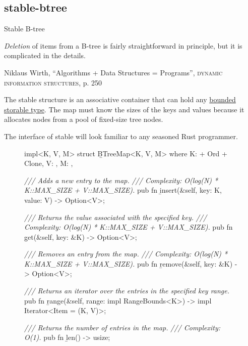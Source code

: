 \documentclass{article}
\begin{document}
\subsection{stable-btree}{Stable B-tree}
\epigraph{
    \emph{Deletion} of items from a B-tree is fairly straightforward in principle, but it is complicated in the details.
}{Niklaus Wirth, ``Algorithms + Data Structures = Programs'', \textsc{dynamic information structures}, p. 250}

The \href{https://docs.rs/ic-stable-structures/0.4.0/ic_stable_structures/btreemap/struct.BTreeMap.html}{} stable structure is an associative container that can hold any \href{#storable-types}{bounded storable type}.
  The map must know the sizes of the keys and values because it allocates nodes from a pool of fixed-size tree nodes.

The interface of stable  will look familiar to any seasoned Rust programmer.

\begin{figure}
\begin{code}[rust]
impl<K, V, M> struct \b{BTreeMap}<K, V, M>
where
  K: \href{#bounded-storable-trait}{} + Ord + Clone,
  V: \href{#bounded-storable-trait}{},
  M: \href{#memory}{},
{
    \emph{/// Adds a new entry to the map.}
    \emph{/// Complexity: O(log(N) * K::MAX_SIZE + V::MAX_SIZE).}
    pub fn \b{insert}(&self, key: K, value: V) -> Option<V>;

    \emph{/// Returns the value associated with the specified key.}
    \emph{/// Complexity: O(log(N) * K::MAX_SIZE + V::MAX_SIZE).}
    pub fn \b{get}(&self, key: &K) -> Option<V>;

    \emph{/// Removes an entry from the map.}
    \emph{/// Complexity: O(log(N) * K::MAX_SIZE + V::MAX_SIZE).}
    pub fn \b{remove}(&self, key: &K) -> Option<V>;

    \emph{/// Returns an iterator over the entries in the specified key range.}
    pub fn \b{range}(&self, range: impl RangeBounds<K>) -> impl Iterator<Item = (K, V)>;

    \emph{/// Returns the number of entries in the map.}
    \emph{/// Complexity: O(1).}
    pub fn \b{len}() -> usize;
}
\end{code}
\end{figure}
\end{document}
